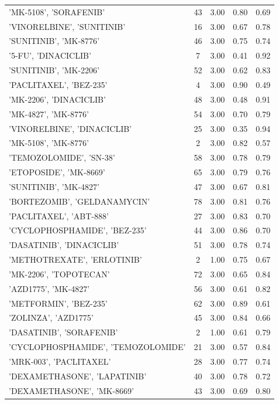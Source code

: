 \begin{center}
\begin{longtable}{@{}lcccc@{}}
    'MK-5108', 'SORAFENIB' & 43 & 3.00 & 0.80 & 0.69 \\
    'VINORELBINE', 'SUNITINIB' & 16 & 3.00 & 0.67 & 0.78 \\
    'SUNITINIB', 'MK-8776' & 46 & 3.00 & 0.75 & 0.74 \\
    '5-FU', 'DINACICLIB' & 7 & 3.00 & 0.41 & 0.92 \\
    'SUNITINIB', 'MK-2206' & 52 & 3.00 & 0.62 & 0.83 \\
    'PACLITAXEL', 'BEZ-235' & 4 & 3.00 & 0.90 & 0.49 \\
    'MK-2206', 'DINACICLIB' & 48 & 3.00 & 0.48 & 0.91 \\
    'MK-4827', 'MK-8776' & 54 & 3.00 & 0.70 & 0.79 \\
    'VINORELBINE', 'DINACICLIB' & 25 & 3.00 & 0.35 & 0.94 \\
    'MK-5108', 'MK-8776' & 2 & 3.00 & 0.82 & 0.57 \\
    'TEMOZOLOMIDE', 'SN-38' & 58 & 3.00 & 0.78 & 0.79 \\
    'ETOPOSIDE', 'MK-8669' & 65 & 3.00 & 0.79 & 0.76 \\
    'SUNITINIB', 'MK-4827' & 47 & 3.00 & 0.67 & 0.81 \\
    'BORTEZOMIB', 'GELDANAMYCIN' & 78 & 3.00 & 0.81 & 0.76 \\
    'PACLITAXEL', 'ABT-888' & 27 & 3.00 & 0.83 & 0.70 \\
    'CYCLOPHOSPHAMIDE', 'BEZ-235' & 44 & 3.00 & 0.86 & 0.70 \\
    'DASATINIB', 'DINACICLIB' & 51 & 3.00 & 0.78 & 0.74 \\
    'METHOTREXATE', 'ERLOTINIB' & 2 & 1.00 & 0.75 & 0.67 \\
    'MK-2206', 'TOPOTECAN' & 72 & 3.00 & 0.65 & 0.84 \\
    'AZD1775', 'MK-4827' & 56 & 3.00 & 0.61 & 0.82 \\
    'METFORMIN', 'BEZ-235' & 62 & 3.00 & 0.89 & 0.61 \\
    'ZOLINZA', 'AZD1775' & 45 & 3.00 & 0.84 & 0.66 \\
    'DASATINIB', 'SORAFENIB' & 2 & 1.00 & 0.61 & 0.79 \\
    'CYCLOPHOSPHAMIDE', 'TEMOZOLOMIDE' & 21 & 3.00 & 0.57 & 0.84 \\
    'MRK-003', 'PACLITAXEL' & 28 & 3.00 & 0.77 & 0.74 \\
    'DEXAMETHASONE', 'LAPATINIB' & 40 & 3.00 & 0.78 & 0.72 \\
    'DEXAMETHASONE', 'MK-8669' & 43 & 3.00 & 0.69 & 0.80 \\

\end{longtable}
\end{center}
